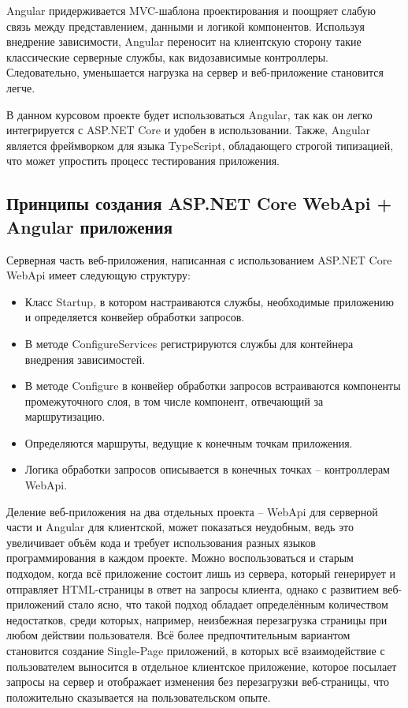 Angular придерживается MVC-шаблона проектирования и поощряет слабую связь между представлением, данными и логикой компонентов. Используя внедрение зависимости, Angular переносит на клиентскую сторону такие классические серверные службы, как видозависимые контроллеры. Следовательно, уменьшается нагрузка на сервер и веб-приложение становится легче.

В данном курсовом проекте будет использоваться Angular, так как он легко интегрируется с ASP.NET Core и удобен в использовании. Также, Angular является фреймворком для языка TypeScript, обладающего строгой типизацией, что может упростить процесс тестирования приложения.

\subsection{Принципы создания ASP.NET Core WebApi + Angular приложения}
Серверная часть веб-приложения, написанная с использованием ASP.NET Core WebApi имеет следующую структуру:
\begin{itemize}
	\item Класс Startup, в котором настраиваются службы, необходимые приложению и определяется конвейер обработки запросов.
	\item В методе ConfigureServices регистрируются службы для контейнера внедрения зависимостей.
	\item В методе Configure в конвейер обработки запросов встраиваются компоненты промежуточного слоя, в том числе компонент, отвечающий за маршрутизацию.
	\item Определяются маршруты, ведущие к конечным точкам приложения.
	\item Логика обработки запросов описывается в конечных точках -- контроллерам WebApi.
\end{itemize}

Деление веб-приложения на два отдельных проекта -- WebApi для серверной части и Angular для клиентской, может показаться неудобным, ведь это увеличивает объём кода и требует использования разных языков программирования в каждом проекте. Можно воспользоваться и старым подходом, когда всё приложение состоит лишь из сервера, который генерирует и отправляет HTML-страницы в ответ на запросы клиента, однако с развитием веб-приложений стало ясно, что такой подход обладает определённым количеством недостатков, среди которых, например, неизбежная перезагрузка страницы при любом действии пользователя. Всё более предпочтительным вариантом становится создание Single-Page приложений, в которых всё взаимодействие с пользователем выносится в отдельное клиентское приложение, которое посылает запросы на сервер и отображает изменения без перезагрузки веб-страницы, что положительно сказывается на пользовательском опыте.

